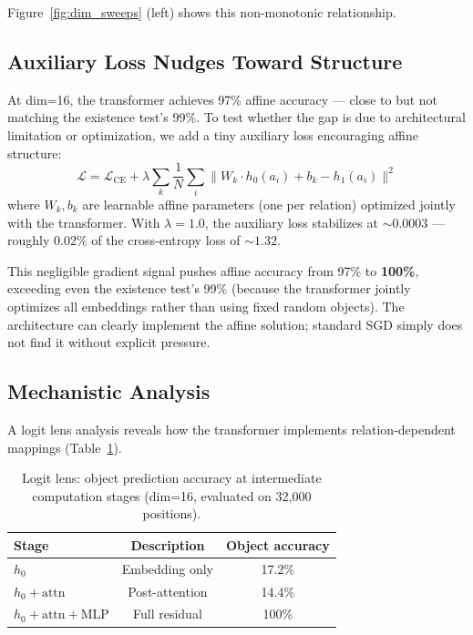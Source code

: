 \documentclass[11pt]{article}
\begin{document}
Figure~\ref{fig:dim_sweeps} (left) shows this non-monotonic relationship.

\subsection{Auxiliary Loss Nudges Toward Structure}

At dim=16, the transformer achieves 97\% affine accuracy --- close to but not matching
the existence test's 99\%. To test whether the gap is due to architectural limitation or
optimization, we add a tiny auxiliary loss encouraging affine structure:
\[
\mathcal{L} = \mathcal{L}_{\text{CE}} + \lambda \sum_{k} \frac{1}{N} \sum_i \| W_k \cdot h_0(a_i) + b_k - h_1(a_i) \|^2
\]
where $W_k, b_k$ are learnable affine parameters (one per relation) optimized jointly
with the transformer. With $\lambda = 1.0$, the auxiliary loss stabilizes at
${\sim}0.0003$ --- roughly 0.02\% of the cross-entropy loss of ${\sim}1.32$.

This negligible gradient signal pushes affine accuracy from 97\% to \textbf{100\%},
exceeding even the existence test's 99\% (because the transformer jointly optimizes all
embeddings rather than using fixed random objects). The architecture can clearly
implement the affine solution; standard SGD simply does not find it without explicit
pressure.

\subsection{Mechanistic Analysis}

A logit lens analysis reveals how the transformer implements relation-dependent mappings
(Table~\ref{tab:logit_lens}).

\begin{table}[h]
\centering
\caption{Logit lens: object prediction accuracy at intermediate computation stages
(dim=16, evaluated on 32{,}000 positions).}
\label{tab:logit_lens}
\begin{tabular}{lcc}
\toprule
Stage & Description & Object accuracy \\
\midrule
$h_0$ & Embedding only & 17.2\% \\
$h_0 + \text{attn}$ & Post-attention & 14.4\% \\
$h_0 + \text{attn} + \text{MLP}$ & Full residual & 100\% \\
\bottomrule
\end{tabular}
\end{table}
\end{document}
